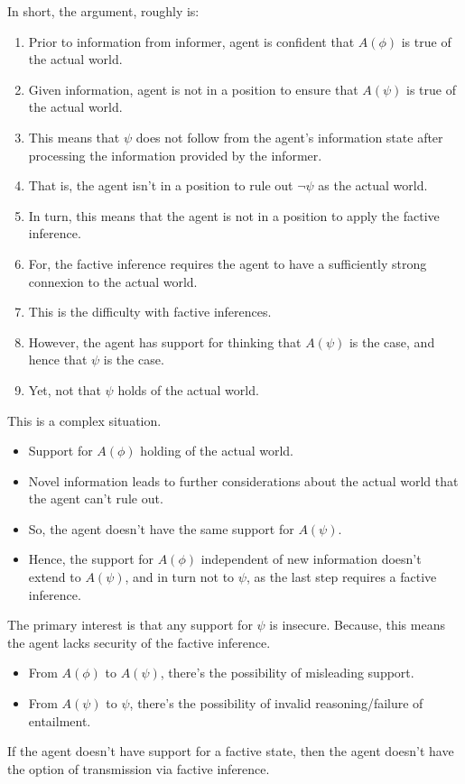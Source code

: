 \documentclass[10pt]{article}
\begin{document}
\begin{note}
  In short, the argument, roughly is:

  \begin{enumerate}
  \item Prior to information from informer, agent is confident that \(A(\phi)\) is true of the actual world.
  \item Given information, agent is not in a position to ensure that \(A(\psi)\) is true of the actual world.
  \item This means that \(\psi\) does not follow from the agent's information state after processing the information provided by the informer.
  \item That is, the agent isn't in a position to rule out \(\lnot\psi\) as the actual world.
  \item In turn, this means that the agent is not in a position to apply the factive inference.
  \item For, the factive inference requires the agent to have a sufficiently strong connexion to the actual world.
  \item This is the difficulty with factive inferences.
  \item However, the agent has support for thinking that \(A(\psi)\) is the case, and hence that \(\psi\) is the case.
  \item Yet, not that \(\psi\) holds of the actual world.
  \end{enumerate}

  This is a complex situation.

  \begin{itemize}
  \item Support for \(A(\phi)\) holding of the actual world.
  \item Novel information leads to further considerations about the actual world that the agent can't rule out.
  \item So, the agent doesn't have the same support for \(A(\psi)\).
  \item Hence, the support for \(A(\phi)\) independent of new information doesn't extend to \(A(\psi)\), and in turn not to \(\psi\), as the last step requires a factive inference.
  \end{itemize}

  The primary interest is that any support for \(\psi\) is insecure.
  Because, this means the agent lacks security of the factive inference.

  \begin{itemize}
  \item From \(A(\phi)\) to \(A(\psi)\), there's the possibility of misleading support.
  \item From \(A(\psi)\) to \(\psi\), there's the possibility of invalid reasoning/failure of entailment.
  \end{itemize}
  If the agent doesn't have support for a factive state, then the agent doesn't have the option of transmission via factive inference.


\end{note}
\end{document}
